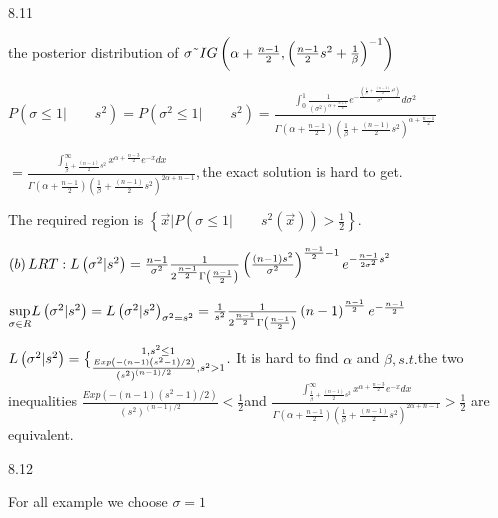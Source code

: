 \documentclass{article}
\def\QATOPD#1#2#3#4{{#3 \atopwithdelims#1#2 #4}}%
\begin{document}
8.11

the posterior distribution of $\sigma \symbol{126}IG\left( \alpha +\frac{n-1%
}{2},\left( \frac{n-1}{2}s^{2}+\frac{1}{\beta }\right) ^{-1}\right) $

\bigskip $P\left( \sigma \leq 1|\qquad s^{2}\right) =P\left( \sigma ^{2}\leq
1|\qquad s^{2}\right) =\frac{\int_{0}^{1}\frac{1}{\left( \sigma ^{2}\right)
^{\alpha +\frac{n+1}{2}}}e^{-\frac{\left( \frac{1}{\beta }+\frac{\left(
n-1\right) }{2}s^{2}\right) }{\sigma ^{2}}}d\sigma ^{2}}{\Gamma \left(
\alpha +\frac{n-1}{2}\right) \left( \frac{1}{\beta }+\frac{\left( n-1\right) 
}{2}s^{2}\right) ^{\alpha +\frac{n-1}{2}}}$

$=\frac{\int_{\frac{1}{\beta }+\frac{\left( n-1\right) }{2}s^{2}}^{\infty
}x^{\alpha +\frac{n-3}{2}}e^{-x}dx}{\Gamma \left( \alpha +\frac{n-1}{2}%
\right) \left( \frac{1}{\beta }+\frac{\left( n-1\right) }{2}s^{2}\right)
^{2\alpha +n-1}},$the exact solution is hard to get.

The required region is $\left\{ \vec{x}|P\left( \sigma \leq 1|\qquad
s^{2}\left( \vec{x}\right) \right) >\frac{1}{2}\right\} .$

$\left( b\right) LRT:L\left( \sigma ^{2}|s^{2}\right) =\frac{n-1}{\sigma ^{2}%
}\frac{1}{2^{\frac{n-1}{2}}\Gamma \left( \frac{n-1}{2}\right) }\left( \frac{%
\left( n-1\right) s^{2}}{\sigma ^{2}}\right) ^{\frac{n-1}{2}-1}e^{-\frac{n-1%
}{2\sigma ^{2}}s^{2}}$

$\underset{\sigma \in R}{\sup }L\left( \sigma ^{2}|s^{2}\right) =L\left(
\sigma ^{2}|s^{2}\right) _{\sigma ^{2}=s^{2}}=\frac{1}{s^{2}}\frac{1}{2^{%
\frac{n-1}{2}}\Gamma \left( \frac{n-1}{2}\right) }\left( n-1\right) ^{\frac{%
n-1}{2}}e^{-\frac{n-1}{2}}$

$L\left( \sigma ^{2}|s^{2}\right) =\QATOPD\{ . {1,s^{2}\leq 1}{\frac{%
Exp\left( -\left( n-1\right) \left( s^{2}-1\right) /2\right) }{\left(
s^{2}\right) ^{\left( n-1\right) /2}},s^{2}>1}.$ It is hard to find $\alpha $
and $\beta ,s.t.$the two inequalities $\frac{Exp\left( -\left( n-1\right)
\left( s^{2}-1\right) /2\right) }{\left( s^{2}\right) ^{\left( n-1\right) /2}%
}<\frac{1}{2}$and $\frac{\int_{\frac{1}{\beta }+\frac{\left( n-1\right) }{2}%
s^{2}}^{\infty }x^{\alpha +\frac{n-3}{2}}e^{-x}dx}{\Gamma \left( \alpha +%
\frac{n-1}{2}\right) \left( \frac{1}{\beta }+\frac{\left( n-1\right) }{2}%
s^{2}\right) ^{2\alpha +n-1}}>\frac{1}{2}$ are equivalent. 

\bigskip 

8.12

For all example we choose $\sigma =1$
\end{document}
